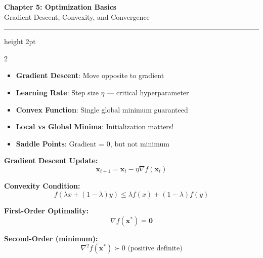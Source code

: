\documentclass[11pt,letterpaper]{article}
\begin{document}
\begin{center}
{\LARGE\bfseries\color{primaryblue} Chapter 5: Optimization Basics}\\[3pt]
{\large Gradient Descent, Convexity, and Convergence}
\end{center}
\vspace{-5pt}
\hrule height 2pt
\vspace{8pt}

\begin{multicols}{2}

\begin{tcolorbox}[conceptbox, title={\faLightbulb\ Key Concepts}]
\begin{itemize}
    \item \textbf{Gradient Descent}: Move opposite to gradient
    \item \textbf{Learning Rate}: Step size $\eta$ --- critical hyperparameter
    \item \textbf{Convex Function}: Single global minimum guaranteed
    \item \textbf{Local vs Global Minima}: Initialization matters!
    \item \textbf{Saddle Points}: Gradient = 0, but not minimum
\end{itemize}
\end{tcolorbox}

\begin{tcolorbox}[formulabox, title={\faCalculator\ Core Formulas}]
\textbf{Gradient Descent Update:}
\[ \mathbf{x}_{t+1} = \mathbf{x}_t - \eta \nabla f(\mathbf{x}_t) \]

\textbf{Convexity Condition:}
\[ f(\lambda x + (1-\lambda)y) \leq \lambda f(x) + (1-\lambda)f(y) \]

\textbf{First-Order Optimality:}
\[ \nabla f(\mathbf{x}^*) = \mathbf{0} \]

\textbf{Second-Order (minimum):}
\[ \nabla^2 f(\mathbf{x}^*) \succ 0 \text{ (positive definite)} \]
\end{tcolorbox}

\columnbreak

\begin{center}
\end{center}
\end{multicols}
\end{document}
